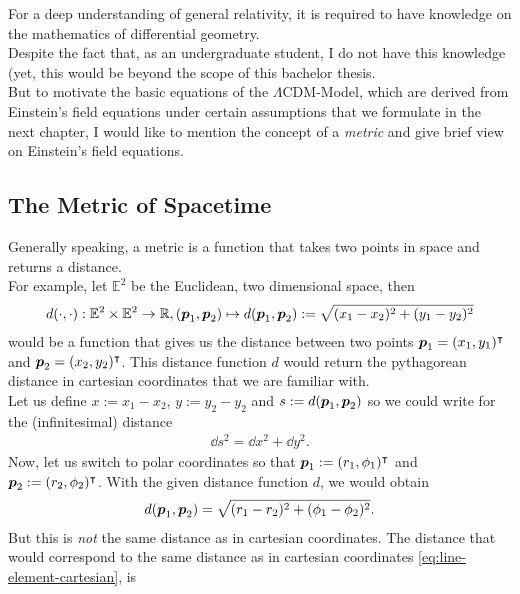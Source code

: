 \noindent For a deep understanding of general relativity, it is required to have knowledge on the mathematics of differential geometry. \\
\noindent Despite the fact that, as an undergraduate student, I do not have this knowledge (yet, this would be beyond the scope of this bachelor thesis. \\
\noindent But to motivate the basic equations of the $\Lambda$CDM-Model, which are derived from Einstein's field equations under certain assumptions that we formulate in the next chapter, I would like to mention the concept of a \textit{metric} and give brief view on Einstein's field equations.

\subsection{The Metric of Spacetime}
Generally speaking, a metric is a function that takes two points in space and returns a distance. \\
For example, let $\mathbb{E}^2$ be the Euclidean, two dimensional space, then
\begin{align}
    d(\cdot, \cdot) : \mathbb{E}^{2} \times \mathbb{E}^{2} \to \mathbb{R}, (\vb*{p}_{1}, \vb*{p}_{2}) \mapsto d(\vb*{p}_{1}, \vb*{p}_{2}) := \sqrt{(x_{1} - x_{2})^2 + (y_{1} - y_{2})^2} 
\end{align}
would be a function that gives us the distance between two points $\vb*{p}_{1} = (x_{1}, y_{1})^{\intercal}$ and $\vb*{p}_{2} = (x_{2}, y_{2})^{\intercal}$. This distance function $d$ would return the pythagorean distance in cartesian coordinates that we are familiar with. \\
Let us define $x := x_{1} - x_{2}$, $y := y_{2} - y_{2}$ and $s := d(\vb*{p}_{1}, \vb*{p}_{2})$ so we could write for the (infinitesimal) distance 
\begin{align}
    \dd{s}^2 = \dd{x}^2 + \dd{y}^2. \label{eq:line-element-cartesian}
\end{align}
Now, let us switch to polar coordinates so that $\vb*{p}_{1} := (r_{1}, \phi_{1})^{\intercal}$ and $\vb*{p}_{2} := (r_{2}, \phi_{2})^{\intercal}$. With the given distance function $d$, we would obtain 
\begin{align}
    d(\vb*{p}_{1}, \vb*{p}_{2}) = \sqrt{(r_{1} - r_{2})^2 + (\phi_{1} - \phi_{2})^2}. 
\end{align}
But this is \textit{not} the same distance as in cartesian coordinates. The distance that would correspond to the same distance as in cartesian coordinates \eqref{eq:line-element-cartesian}, is
